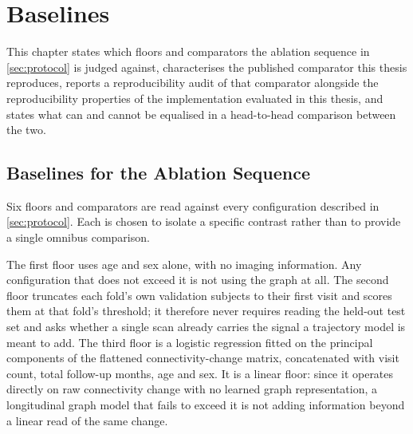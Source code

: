 
\chapter{Baselines}\label{ch:baselines}


This chapter states which floors and comparators the ablation sequence in
\autoref{sec:protocol} is judged against, characterises the published comparator this
thesis reproduces, reports a reproducibility audit of that comparator alongside the
reproducibility properties of the implementation evaluated in this thesis, and states what
can and cannot be equalised in a head-to-head comparison between the two.

\section{Baselines for the Ablation Sequence}\label{sec:baseline-sequence}

Six floors and comparators are read against every configuration described in
\autoref{sec:protocol}. Each is chosen to isolate a specific contrast rather than to
provide a single omnibus comparison.

The first floor uses age and sex alone, with no imaging information. Any configuration that does not
exceed it is not using the graph at all. The second floor truncates each fold's own
validation subjects to their first visit and scores them at that fold's threshold; it
therefore never requires reading the held-out test set and asks whether a single scan
already carries the signal a trajectory model is meant to add. The third floor is a
logistic regression fitted on the principal components of the flattened connectivity-change
matrix, concatenated with visit count, total follow-up months, age and sex. It is a linear
floor: since it operates directly on raw connectivity change with no learned graph
representation, a longitudinal graph model that fails to exceed it is not adding
information beyond a linear read of the same change.

